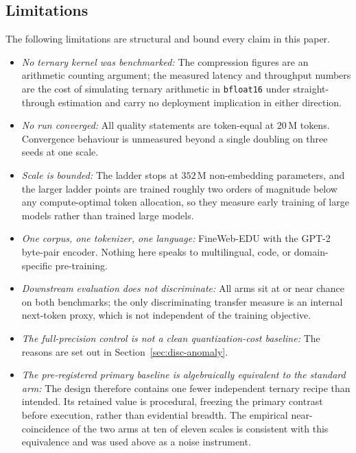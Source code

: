 \documentclass[final,5p,times,twocolumn]{elsarticle}
\theoremstyle{remark}
\begin{document}
\subsection{Limitations}
\label{sec:disc-limitations}

The following limitations are structural and bound every claim in this paper.

\begin{itemize}
\item[] \textit{No ternary kernel was benchmarked:} The compression figures are
an arithmetic counting argument; the measured latency and throughput numbers
are the cost of simulating ternary arithmetic in \texttt{bfloat16} under
straight-through estimation and carry no deployment implication in either
direction.

\item[] \textit{No run converged:} All quality statements are token-equal at
$20$\,M tokens. Convergence behaviour is unmeasured beyond a single doubling
on three seeds at one scale.

\item[] \textit{Scale is bounded:} The ladder stops at $352$\,M non-embedding
parameters, and the larger ladder points are trained roughly two orders of
magnitude below any compute-optimal token allocation, so they measure early
training of large models rather than trained large models.

\item[] \textit{One corpus, one tokenizer, one language:} FineWeb-EDU with the
GPT-2 byte-pair encoder. Nothing here speaks to multilingual, code, or
domain-specific pre-training.

\item[] \textit{Downstream evaluation does not discriminate:} All arms sit at or
near chance on both benchmarks; the only discriminating transfer measure is an
internal next-token proxy, which is not independent of the training objective.

\item[] \textit{The full-precision control is not a clean quantization-cost
baseline:} The reasons are set out in Section~\ref{sec:disc-anomaly}.

\item[] \textit{The pre-registered primary baseline is algebraically equivalent
to the standard arm:} The design therefore contains one fewer independent
ternary recipe than intended. Its retained value is procedural, freezing the
primary contrast before execution, rather than evidential breadth. The
empirical near-coincidence of the two arms at ten of eleven scales is
consistent with this equivalence and was used above as a noise instrument.


\end{itemize}
\end{document}
